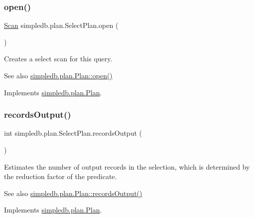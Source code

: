 \subsubsection{\texorpdfstring{open()}{open()}}
{\footnotesize\ttfamily \hyperlink{interfacesimpledb_1_1query_1_1Scan}{Scan} simpledb.\+plan.\+Select\+Plan.\+open (\begin{DoxyParamCaption}{ }\end{DoxyParamCaption})\hspace{0.3cm}{\ttfamily [inline]}}

Creates a select scan for this query. \begin{DoxySeeAlso}{See also}
\hyperlink{interfacesimpledb_1_1plan_1_1Plan_aaa4c15cda4e9c0d52308850f9f13ff99}{simpledb.\+plan.\+Plan\+::open()} 
\end{DoxySeeAlso}


Implements \hyperlink{interfacesimpledb_1_1plan_1_1Plan_aaa4c15cda4e9c0d52308850f9f13ff99}{simpledb.\+plan.\+Plan}.

\mbox{\label{classsimpledb_1_1plan_1_1SelectPlan_af68bc517292c7bd5706b191f30124a2e}} 
\subsubsection{\texorpdfstring{records\+Output()}{recordsOutput()}}
{\footnotesize\ttfamily int simpledb.\+plan.\+Select\+Plan.\+records\+Output (\begin{DoxyParamCaption}{ }\end{DoxyParamCaption})\hspace{0.3cm}{\ttfamily [inline]}}

Estimates the number of output records in the selection, which is determined by the reduction factor of the predicate. \begin{DoxySeeAlso}{See also}
\hyperlink{interfacesimpledb_1_1plan_1_1Plan_a187e06657d356c80a7f743d7ff8fd257}{simpledb.\+plan.\+Plan\+::records\+Output()} 
\end{DoxySeeAlso}


Implements \hyperlink{interfacesimpledb_1_1plan_1_1Plan_a187e06657d356c80a7f743d7ff8fd257}{simpledb.\+plan.\+Plan}.

\mbox{\label{classsimpledb_1_1plan_1_1SelectPlan_a74090f0d52af6e4f8d5fe925fac3cb4c}} 
